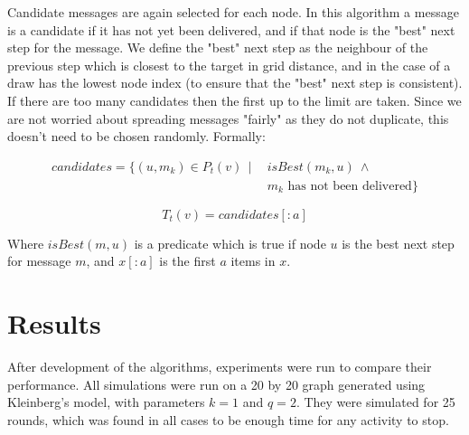 \documentclass[bsc,frontabs,twoside,singlespacing,parskip,deptreport]{infthesis}     %
\begin{document}
Candidate messages are again selected for each node. In this algorithm a message is a candidate if it has not yet been delivered, and if that node is the "best" next step for the message. We define the "best" next step as the neighbour of the previous step which is closest to the target in grid distance, and in the case of a draw has the lowest node index (to ensure that the "best" next step is consistent). If there are too many candidates then the first up to the limit are taken. Since we are not worried about spreading messages "fairly" as they do not duplicate, this doesn't need to be chosen randomly. Formally:

\begin{equation}
\begin{split}
candidates = \{ (u, m_{k}) \in P_{t}(v) \:\: | \:\: & isBest(m_{k}, u) \: \wedge \\
& m_{k} \mbox{ has not been delivered} \}
\end{split}
\end{equation}

\begin{equation}
T_{t}(v) = candidates[:a]
\end{equation}

Where $isBest(m, u)$ is a predicate which is true if node $u$ is the best next step for message $m$, and $x[:a]$ is the first $a$ items in $x$.

\section{Results}
After development of the algorithms, experiments were run to compare their performance. All simulations were run on a 20 by 20 graph generated using Kleinberg's model, with parameters $k = 1$ and $q = 2$. They were simulated for 25 rounds, which was found in all cases to be enough time for any activity to stop. 
\end{document}
